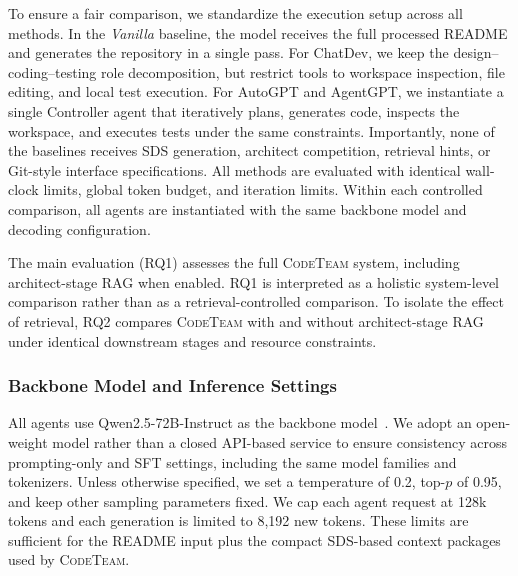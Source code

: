 \documentclass[format=acmsmall, review=false, screen=true]{acmart}
\newcommand{\tool}{\textsc{CodeTeam}\xspace}
\begin{document}
To ensure a fair comparison, we standardize the execution setup across all methods. In the \emph{Vanilla} baseline, the model receives the full processed README and generates the repository in a single pass. For ChatDev, we keep the design--coding--testing role decomposition, but restrict tools to workspace inspection, file editing, and local test execution. For AutoGPT and AgentGPT, we instantiate a single Controller agent that iteratively plans, generates code, inspects the workspace, and executes tests under the same constraints. Importantly, none of the baselines receives SDS generation, architect competition, retrieval hints, or Git-style interface specifications. All methods are evaluated with identical wall-clock limits, global token budget, and iteration limits. Within each controlled comparison, all agents are instantiated with the same backbone model and decoding configuration.

The main evaluation (RQ1) assesses the full \tool system, including architect-stage RAG when enabled. RQ1 is interpreted as a holistic system-level comparison rather than as a retrieval-controlled comparison. To isolate the effect of retrieval, RQ2 compares \tool with and without architect-stage RAG under identical downstream stages and resource constraints.

\subsubsection{Backbone Model and Inference Settings}
All agents use Qwen2.5-72B-Instruct as the backbone model~\cite{Qwen2024Qwen25}. We adopt an open-weight model rather than a closed API-based service to ensure consistency across prompting-only and SFT settings, including the same model families and tokenizers. Unless otherwise specified, we set a temperature of 0.2, top-$p$ of 0.95, and keep other sampling parameters fixed. We cap each agent request at 128k tokens and each generation is limited to 8,192 new tokens. These limits are sufficient for the README input plus the compact SDS-based context packages used by \tool.
\end{document}
